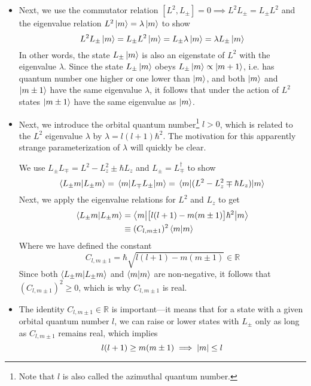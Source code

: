 \documentclass[11pt, a4paper]{article}
\newcommand{\bmel}[3]{\big \langle {#1} \big | {#2} \big | {#3} \big \rangle}  %
\begin{document}
\begin{itemize}
	\item Next, we use the commutator relation $ [L^{2}, L_{\pm}] = 0 \implies L^{2} L_{\pm} = L_{\pm} L^{2}  $ and the eigenvalue relation $ L^{2}\ket{m} = \lambda \ket{m} $ to show
	\begin{equation*}
		L^{2} L_{\pm}\ket{m} = L_{\pm} L^{2} \ket{m} = L_{\pm}\lambda \ket{m} = \lambda L_{\pm} \ket{m}
	\end{equation*}
    In other words, the state $ L_{\pm} \ket{m} $ is also an eigenstate of $ L^{2} $ with the eigenvalue $ \lambda $. Since the state $ L_{\pm} \ket{m} $ obeys $ L_{\pm} \ket{m} \propto \ket{m + 1} $, i.e. has quantum number one higher or one lower than $ \ket{m} $, and both $ \ket{m} $ and $ \ket{m \pm 1} $ have the same eigenvalue $ \lambda $, it follows that under the action of $ L^{2} $ states $ \ket{m \pm 1} $ have the same eigenvalue as $ \ket{m} $.
	
	\item Next, we introduce the orbital quantum number\footnote{Note that $ l $ is also called the azimuthal quantum number.} $ l > 0 $, which is related to the $ L^{2} $ eigenvalue $ \lambda $ by $ \lambda = l(l+1)\hbar^{2} $. The motivation for this apparently strange parameterization of $ \lambda $ will quickly be clear.
	
	We use $ L_{\pm}L_{\mp} = L^{2} - L_{z}^{2} \pm \hbar L_{z} $ and $ L_{\pm} = L_{\mp}^{\dagger} $ to show
	\begin{equation*}
		\braket{L_{\pm}m}{L_{\pm}m} = \mel{m}{L_{\mp}L_{\pm}}{m} = \mel{m}{(L^{2} - L_{z}^{2} \mp \hbar L_{z})}{m}\\
	\end{equation*}
	Next, we apply the eigenvalue relations for $ L^{2} $ and $ L_{z} $ to get
	\begin{align*}
		\braket{L_{\pm}m}{L_{\pm}m} &= \bmel{m}{\big[l (l+1) - m(m\pm 1)\big]\hbar^{2}}{m}\\
		&\equiv (C_{l,m\pm 1})^{2} \braket{m}{m}
	\end{align*}
	Where we have defined the constant
	\begin{equation*}
		C_{l, m\pm1} = \hbar \sqrt{l (l+1) - m(m\pm 1)} \in \mathbb{R}
	\end{equation*}
	Since both $ \braket{L_{\pm}m}{L_{\pm}m} $ and $ \braket{m}{m} $ are non-negative, it follows that $ (C_{l,m\pm 1})^{2} \geq 0 $, which is why $ C_{l, m\pm1} $ is real.
	
	\item The identity $  C_{l, m\pm1} \in \mathbb{R} $ is important---it means that for a state with a given orbital quantum number $ l $, we can raise or lower states with $ L_{\pm} $ only as long as $  C_{l, m\pm1} $ remains real, which implies
	\begin{equation*}
		l (l+1) \geq m(m\pm 1) \implies \abs{m} \leq l
	\end{equation*}
	
\end{itemize}
\end{document}
